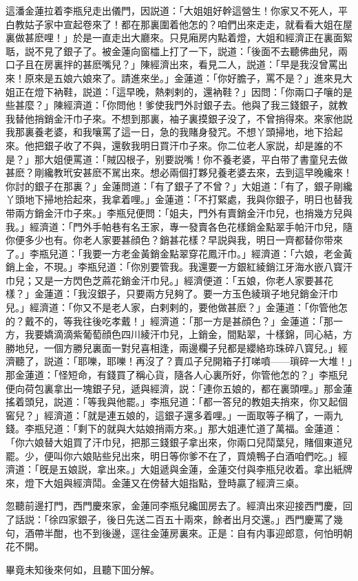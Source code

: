 這潘金蓮拉着李瓶兒走出儀門，因説道：「大姐姐好幹這營生！你家又不死人，平白教姑子家中宣起卷來了！都在那裏圍着他怎的？咱們出來走走，就看看大姐在屋裏做甚麽哩！」於是一直走出大廳來。只見廂房内點着燈，大姐和經濟正在裏面絮聒，説不見了銀子了。被金蓮向窗櫺上打了一下，説道：「後面不去聽佛曲兒，兩口子且在房裏拌的甚麽嘴兒？」陳經濟出來，看見二人，説道：「早是我沒曾罵出來！原來是五娘六娘來了。請進來坐。」金蓮道：「你好膽子，罵不是？」進來見大姐正在燈下衲鞋，説道：「這早晚，熱剌剌的，還衲鞋？」因問：「你兩口子嚷的是些甚麼？」陳經濟道：「你問他！爹使我門外討銀子去。他與了我三錢銀子，就教我替他捎銷金汗巾子來。不想到那裏，袖子裏摸銀子没了，不曾捎得來。來家他説我那裏養老婆，和我嚷罵了這一日，急的我賭身發咒。不想丫頭掃地，地下拾起來。他把銀子收了不與，還敎我明日買汗巾子來。你二位老人家説，却是誰的不是？」那大姐便罵道：「賊囚根子，别要説嘴！你不養老婆，平白带了書童兒去做甚麽？剛纔教玳安甚麽不駡出來。想必兩個打夥兒養老婆去來，去到這早晚纔來！你討的銀子在那裏？」金蓮問道：「有了銀子了不曾？」大姐道：「有了，銀子剛纔丫頭地下掃地拾起來，我拿着哩。」金蓮道：「不打緊處，我與你銀子，明日也替我带兩方銷金汗巾子來。」李瓶兒便問：「姐夫，門外有賣銷金汗巾兒，也捎幾方兒與我。」經濟道：「門外手帕巷有名王家，專一發賣各色花樣銷金點翠手帕汗巾兒，隨你便多少也有。你老人家要甚顔色？銷甚花樣？早説與我，明日一齊都替你带來了。」李瓶兒道：「我要一方老金黃銷金點翠穿花鳳汗巾。」經濟道：「六娘，老金黃銷上金，不現。」李瓶兒道：「你別要管我。我還要一方銀紅綾銷江牙海水嵌八寳汗巾兒；又是一方閃色芝蔴花銷金汗巾兒。」經濟便道：「五娘，你老人家要甚花樣？」金蓮道：「我沒銀子，只要兩方兒夠了。要一方玉色綾瑣子地兒銷金汗巾兒。」經濟道：「你又不是老人家，白剌剌的，要他做甚麽？」金蓮道：「你管他怎的？戴不的，等我往後吃孝戴！」經濟道：「那一方是甚顔色？」金蓮道：「那一方，我要嬌滴滴紫葡萄顔色四川綾汗巾兒，上銷金，間點翠，十樣錦，同心結，方勝地兒，一個方勝兒裏面一對兒喜相逢，兩邊欄子兒都是纓絡珎珠碎八寳兒。」經濟聽了，説道：「耶嚛，耶嚛！再沒了？賣瓜子兒開箱子打㖒噴——瑣碎一大堆！」那金蓮道：「怪短命，有錢買了稱心貨，隨各人心裏所好，你管他怎的？」李瓶兒便向荷包裏拿出一塊銀子兒，遞與經濟，説：「連你五娘的，都在裏頭哩。」那金蓮搖着頭兒，説道：「等我與他罷。」李瓶兒道：「都一答兒的教姐夫捎來，你又起個窖兒？」經濟道：「就是連五娘的，這銀子還多着哩。」一面取等子稱了，一兩九錢。李瓶兒道：「剩下的就與大姑娘捎兩方來。」那大姐連忙道了萬福。金蓮道：「你六娘替大姐買了汗巾兒，把那三錢銀子拿出來，你兩口兒鬦葉兒，賭個東道兒罷。少，便叫你六娘貼些兒出來，明日等你爹不在了，買燒鴨子白酒咱們吃。」經濟道：「旣是五娘説，拿出來。」大姐遞與金蓮，金蓮交付與李瓶兒收着。拿出紙牌來，燈下大姐與經濟鬦。金蓮又在傍替大姐指點，登時贏了經濟三桌。

忽聽前邊打門，西門慶來家，金蓮同李瓶兒纔囬房去了。經濟出來迎接西門慶，回了話説：「徐四家銀子，後日先送二百五十兩來，餘者出月交還。」西門慶罵了幾句，酒帶半酣，也不到後邊，逕往金蓮房裏來。正是：自有内事迎郎意，何怕明朝花不開。

畢竟未知後來何如，且聽下囬分解。

